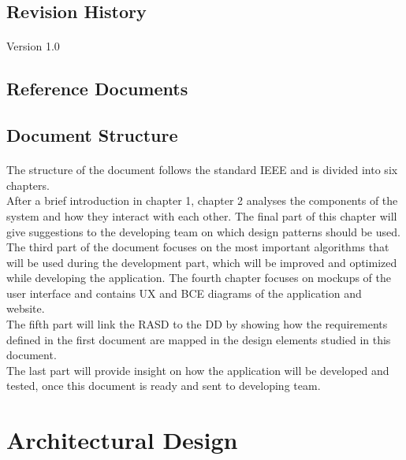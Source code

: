 \documentclass{article}
\begin{document}
		\subsection{Revision History}
			\paragraph{}Version 1.0
		\subsection{Reference Documents}
		\subsection{Document Structure}
			\paragraph{}The structure of the document follows the standard IEEE and is divided into six chapters.\\
After a brief introduction in chapter 1, chapter 2 analyses the components of the system and how they interact with each other. The final part of this chapter will give suggestions to the developing team on which design patterns should be used.\\
The third part of the document focuses on the most important algorithms that will be used during the development part, which will be improved and optimized while developing the application.
The fourth chapter focuses on mockups of the user interface and contains UX and BCE diagrams of the application and website.\\
The fifth part will link the RASD to the DD by showing how the requirements defined in the first document are mapped in the design elements studied in this document.\\
The last part will provide insight on how the application will be developed and tested, once this document is ready and sent to developing team.

		\newpage
	\section{Architectural Design}
\end{document}
